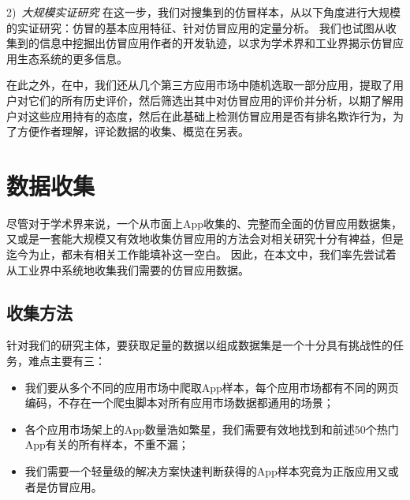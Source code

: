 2)\ \emph{大规模实证研究} \quad
在这一步，我们对搜集到的仿冒样本，从以下角度进行大规模的实证研究：仿冒的基本应用特征、针对仿冒应用的定量分析。
我们也试图从收集到的信息中挖掘出仿冒应用作者的开发轨迹，以求为学术界和工业界揭示仿冒应用生态系统的更多信息。

在此之外，在中，我们还从几个第三方应用市场中随机选取一部分应用，提取了用户对它们的所有历史评价，然后筛选出其中对仿冒应用的评价并分析，以期了解用户对这些应用持有的态度，然后在此基础上检测仿冒应用是否有排名欺诈行为，为了方便作者理解，评论数据的收集、概览在另表。

\section{数据收集}
尽管对于学术界来说，一个从市面上App收集的、完整而全面的仿冒应用数据集，又或是一套能大规模又有效地收集仿冒应用的方法会对相关研究十分有裨益，但是迄今为止，都未有相关工作能填补这一空白。
因此，在本文中，我们率先尝试着从工业界中系统地收集我们需要的仿冒应用数据。

\subsection{收集方法}
针对我们的研究主体，要获取足量的数据以组成数据集是一个十分具有挑战性的任务，难点主要有三：
\begin{itemize}
	\item 我们要从多个不同的应用市场中爬取App样本，每个应用市场都有不同的网页编码，不存在一个爬虫脚本对所有应用市场数据都通用的场景；
	\item 各个应用市场架上的App数量浩如繁星，我们需要有效地找到和前述50个热门App有关的所有样本，不重不漏；
	\item 我们需要一个轻量级的解决方案快速判断获得的App样本究竟为正版应用又或者是仿冒应用。
\end{itemize}

